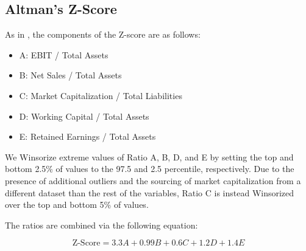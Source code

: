 \documentclass{article}[11pt]
\begin{document}
    \subsection{Altman's Z-Score}

    \label{sec:altman-z-score}

    As in \cite{das_credit_2023}, the components of the Z-score are as follows:

    \begin{itemize}
        \item A: EBIT / Total Assets
        \item B: Net Sales / Total Assets
        \item C: Market Capitalization / Total Liabilities
        \item D: Working Capital / Total Assets
        \item E: Retained Earnings / Total Assets
    \end{itemize}

    We Winsorize extreme values of Ratio A, B, D, and E by setting the top and bottom 2.5\% of values to the 97.5 and 2.5 percentile, respectively. Due to the presence of additional outliers and the sourcing of market capitalization from a different dataset than the rest of the variables, Ratio C is instead Winsorized over the top and bottom 5\% of values. 

    The ratios are combined via the following equation:

    \begin{equation*}
        \text{Z-Score} = 3.3 A + 0.99 B + 0.6 C + 1.2 D + 1.4 E
    \end{equation*}
\end{document}
